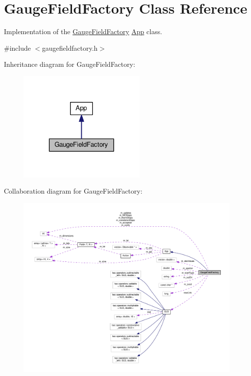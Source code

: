 \hypertarget{classGaugeFieldFactory}{}\section{Gauge\+Field\+Factory Class Reference}
\label{classGaugeFieldFactory}


Implementation of the \hyperlink{classGaugeFieldFactory}{Gauge\+Field\+Factory} \hyperlink{classApp}{App} class.  




{\ttfamily \#include $<$gaugefieldfactory.\+h$>$}



Inheritance diagram for Gauge\+Field\+Factory\+:\nopagebreak
\begin{figure}[H]
\begin{center}
\leavevmode
\includegraphics[width=179pt]{da/deb/classGaugeFieldFactory__inherit__graph}
\end{center}
\end{figure}


Collaboration diagram for Gauge\+Field\+Factory\+:\nopagebreak
\begin{figure}[H]
\begin{center}
\leavevmode
\includegraphics[width=350pt]{df/dd0/classGaugeFieldFactory__coll__graph}
\end{center}
\end{figure}
